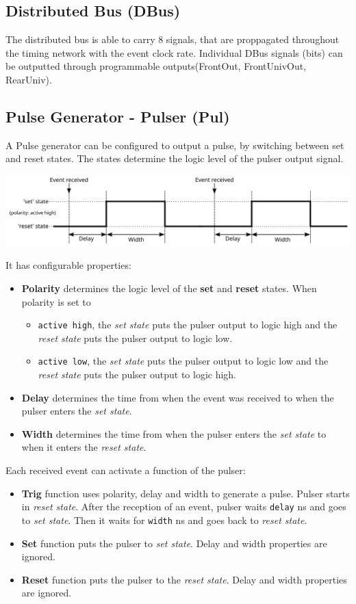 \documentclass[12pt,a4paper]{article}
\begin{document}
\subsection{Distributed Bus (DBus)}
The distributed bus is able to carry 8 signals, that are proppagated throughout the timing network with the event clock rate. Individual DBus signals (bits) can be outputted through programmable outputs(FrontOut, FrontUnivOut, RearUniv). 

\subsection{Pulse Generator - Pulser (Pul)}
A Pulse generator can be configured to output a pulse, by switching between set and reset states. The states determine the logic level of the pulser output signal.

	\includegraphics[width=\columnwidth]{./img/pulserGeneric}

It has configurable properties:
\begin{itemize}
	\item \textbf{Polarity} determines the logic level of the \textbf{set} and \textbf{reset} states. When polarity is set to
	\begin{itemize}
		\item \texttt{active high}, the \textit{set state} puts the pulser output to logic high and the \textit{reset state} puts the pulser output to logic low. 
		\item \texttt{active low}, the \textit{set state} puts the pulser output to logic low and the \textit{reset state} puts the pulser output to logic high.
	\end{itemize}
	\item  \textbf{Delay} determines the time from when the event was received to when the pulser enters the \textit{set state}.
	\item  \textbf{Width} determines the time from when the pulser enters the \textit{set state} to when it enters the \textit{reset state}.
\end{itemize}

Each received event can activate a function of the pulser:
\begin{itemize}
	\item \textbf{Trig} function uses polarity, delay and width to generate a pulse. Pulser starts in \textit{reset state}. After the reception of an event, pulser waits \texttt{delay} ns and goes to \textit{set state}. Then it waits for \texttt{width} ns and goes back to \textit{reset state}.
	\item \textbf{Set} function puts the pulser to \textit{set state}. Delay and width properties are ignored.
	\item \textbf{Reset} function puts the pulser to the \textit{reset state}. Delay and width properties are ignored.
\end{itemize}
\end{document}

